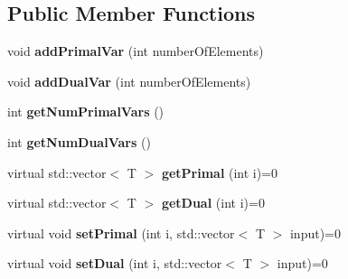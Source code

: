 \subsection*{Public Member Functions}
\begin{DoxyCompactItemize}
\item 
\mbox{\label{classflex_box_data_a27e0928199d86a7e281308bf777aa8e2}} 
void {\bfseries add\+Primal\+Var} (int number\+Of\+Elements)
\item 
\mbox{\label{classflex_box_data_a9ca9476d38c912fd7576d94305a8e18c}} 
void {\bfseries add\+Dual\+Var} (int number\+Of\+Elements)
\item 
\mbox{\label{classflex_box_data_a13623baeecd5c7a1b1eca93c2bbb8e0e}} 
int {\bfseries get\+Num\+Primal\+Vars} ()
\item 
\mbox{\label{classflex_box_data_a4a9fb2a7ec29ad7a3bb4b7f041749d3a}} 
int {\bfseries get\+Num\+Dual\+Vars} ()
\item 
\mbox{\label{classflex_box_data_a6cad656c27608f70f3fda907beb9a2ed}} 
virtual std\+::vector$<$ T $>$ {\bfseries get\+Primal} (int i)=0
\item 
\mbox{\label{classflex_box_data_a3396e16e4c3a57279fd792fd84a76464}} 
virtual std\+::vector$<$ T $>$ {\bfseries get\+Dual} (int i)=0
\item 
\mbox{\label{classflex_box_data_a90cedf65f8a977d4a1944cce8df3d462}} 
virtual void {\bfseries set\+Primal} (int i, std\+::vector$<$ T $>$ input)=0
\item 
\mbox{\label{classflex_box_data_a019d18a177433aefb77539ba48885153}} 
virtual void {\bfseries set\+Dual} (int i, std\+::vector$<$ T $>$ input)=0
\end{DoxyCompactItemize}
